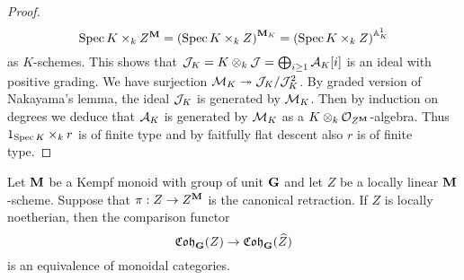 \begin{proof}
$$\mathrm{Spec}\, K\times_k Z^{\mathbf{M}} = \left(\mathrm{Spec}\, K \times_k Z\right)^{\mathbf{M}_K} = \left(\mathrm{Spec}\, K \times_k Z\right)^{\mathbb{A}^1_K}$$
as $K$-schemes. This shows that ${\mathcal J}_K = K\otimes_k{\mathcal J} = \bigoplus_{i\geq 1} {\mathcal A}_K[i]$ is an ideal with positive grading. We have surjection ${\mathcal M}_K\twoheadrightarrow {\mathcal J}_K/{\mathcal J}_K^2$. By graded version of Nakayama's lemma, the ideal ${\mathcal J}_K$  is generated by ${\mathcal M}_K$. Then by induction on degrees we deduce that ${\mathcal A}_K$ is generated by ${\mathcal M}_K$ as a $K\otimes_k{\mathcal O}_{Z^{\mathbf{M}}}$-algebra. Thus $1_{\mathrm{Spec}\, K}\times_k r$ is of finite type and by faitfully flat descent also $r$ is of finite type.
\end{proof}

\begin{theorem}
Let $\mathbf{M}$ be a Kempf monoid with group of unit $\mathbf{G}$ and let $Z$ be a locally linear $\mathbf{M}$-scheme. Suppose that $\pi:Z\rightarrow Z^{\mathbf{M}}$ is the canonical retraction. If $Z$ is locally noetherian, then the comparison functor
$$\mathfrak{Coh}_{\mathbf{G}}(Z)\rightarrow \mathfrak{Coh}_{\mathbf{G}}(\widehat{Z})$$
is an equivalence of monoidal categories.
\end{theorem}
